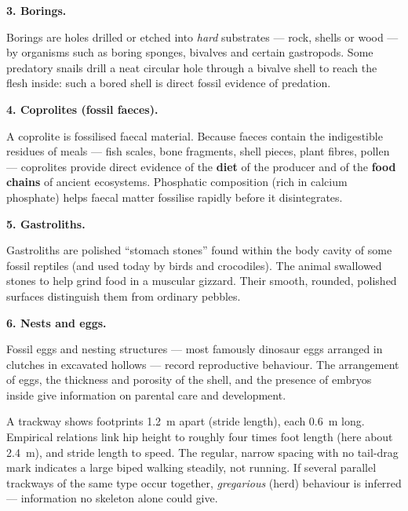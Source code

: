 \documentclass[11pt]{article}
\newcommand{\cle}[1]{{\popxbold\color{popdark}#1}}
\begin{document}
\textbf{3. Borings.}\par
\cle{Borings} are holes drilled or etched into \emph{hard} substrates --- rock, shells or wood --- by organisms such as boring sponges, bivalves and certain gastropods. Some predatory snails drill a neat circular hole through a bivalve shell to reach the flesh inside: such a bored shell is direct fossil evidence of predation.

\textbf{4. Coprolites (fossil faeces).}\par
\begin{definition}[Coprolite]
A \cle{coprolite} is fossilised faecal material. Because faeces contain the indigestible residues of meals --- fish scales, bone fragments, shell pieces, plant fibres, pollen --- coprolites provide direct evidence of the \textbf{diet} of the producer and of the \textbf{food chains} of ancient ecosystems. Phosphatic composition (rich in calcium phosphate) helps faecal matter fossilise rapidly before it disintegrates.
\end{definition}

\textbf{5. Gastroliths.}\par
\cle{Gastroliths} are polished ``stomach stones'' found within the body cavity of some fossil reptiles (and used today by birds and crocodiles). The animal swallowed stones to help grind food in a muscular gizzard. Their smooth, rounded, polished surfaces distinguish them from ordinary pebbles.

\textbf{6. Nests and eggs.}\par
Fossil \cle{eggs} and \cle{nesting structures} --- most famously dinosaur eggs arranged in clutches in excavated hollows --- record reproductive behaviour. The arrangement of eggs, the thickness and porosity of the shell, and the presence of embryos inside give information on parental care and development.

\begin{exemplebox}
A trackway shows footprints \SI{1.2}{m} apart (stride length), each \SI{0.6}{m} long. Empirical relations link hip height to roughly four times foot length (here about \SI{2.4}{m}), and stride length to speed. The regular, narrow spacing with no tail-drag mark indicates a large biped walking steadily, not running. If several parallel trackways of the same type occur together, \emph{gregarious} (herd) behaviour is inferred --- information no skeleton alone could give.
\end{exemplebox}
\end{document}
